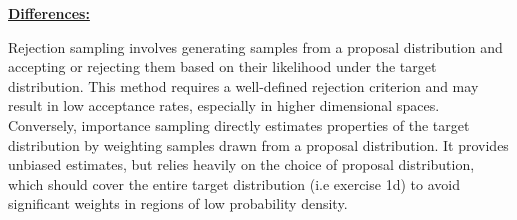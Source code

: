 \underline{\textbf{Differences:}}

 Rejection sampling involves generating samples from a proposal distribution and accepting or rejecting them based on their likelihood under the target distribution. This method requires a well-defined rejection criterion and may result in low acceptance rates, especially in higher dimensional spaces. Conversely, importance sampling directly estimates properties of the target distribution by weighting samples drawn from a proposal distribution. It provides unbiased estimates, but relies heavily on the choice of proposal distribution, which should cover the entire target distribution (i.e exercise 1d) to avoid significant weights in regions of low probability density. 